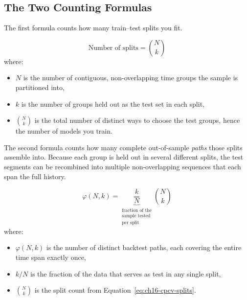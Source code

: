 \subsection{The Two Counting Formulas}

The first formula counts how many train--test splits you fit.

\begin{equation}
\label{eq:ch16-cpcv-splits}
\text{Number of splits} = \binom{N}{k}
\end{equation}
where:
\begin{itemize}[nosep]
  \item $N$ is the number of contiguous, non-overlapping time groups the sample is partitioned into,
  \item $k$ is the number of groups held out as the test set in each split,
  \item $\binom{N}{k}$ is the total number of distinct ways to choose the test groups, hence the number of models you train.
\end{itemize}

The second formula counts how many complete out-of-sample \emph{paths} those splits assemble into.
Because each group is held out in several different splits, the test segments can be recombined into multiple non-overlapping sequences that each span the full history.

\begin{equation}
\label{eq:ch16-cpcv-paths}
\varphi(N, k) = \underbrace{\frac{k}{N}}_{\substack{\text{fraction of the} \\ \text{sample tested} \\ \text{per split}}} \binom{N}{k}
\end{equation}
where:
\begin{itemize}[nosep]
  \item $\varphi(N,k)$ is the number of distinct backtest paths, each covering the entire time span exactly once,
  \item $k/N$ is the fraction of the data that serves as test in any single split,
  \item $\binom{N}{k}$ is the split count from Equation~\eqref{eq:ch16-cpcv-splits}.
\end{itemize}

